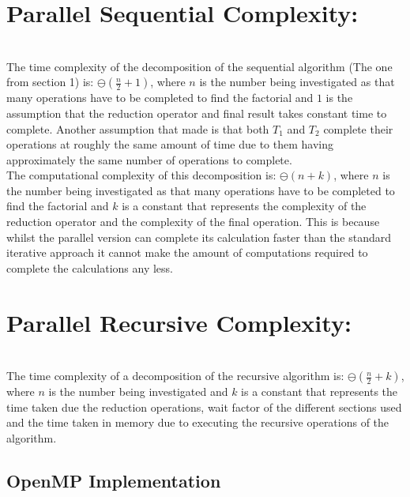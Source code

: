 \documentclass[11pt]{article}
\begin{document}
\begin{page}
\noindent \chapter{Parallel Sequential Complexity:} \\
The time complexity of the decomposition of the sequential algorithm (The one from section 1) is: $\ominus(\frac{n}{2} + 1)$, where $n$ is the number being investigated as that many operations have to be completed to find the factorial and $1$ is the assumption that the reduction operator and final result takes constant time to complete. Another assumption that made is that both $T_1$ and $T_2$ complete their operations at roughly the same amount of time due to them having approximately the same number of operations to complete.\\

\noindent The computational complexity of this decomposition is: $\ominus(n + k)$, where $n$ is the number being investigated as that many operations have to be completed to find the factorial and $k$ is a constant that represents the complexity of the reduction operator and the complexity of the final operation. This is because whilst the parallel version can complete its calculation faster than the standard iterative approach it cannot make the amount of computations required to complete the calculations any less.\\

\noindent \chapter{Parallel Recursive Complexity:} \\
The time complexity of a decomposition of the recursive algorithm is: $\ominus(\frac{n}{2} + k)$, where $n$ is the number being investigated and $k$ is a constant that represents the time taken due the reduction operations, wait factor of the different sections used and the time taken in memory due to executing the recursive operations of the algorithm.\\



\section{OpenMP Implementation}


\end{page}
\end{document}
